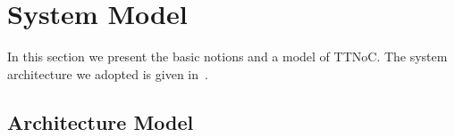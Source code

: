 \documentclass[journal]{IEEEtran}
\theoremstyle{remark}
\begin{document}
%



\section{System Model}
\label{s:model}

In this section we present the basic notions and a model of TTNoC.
The system architecture we adopted is given in~\cite{DBLP:conf/rtcsa/PaukovitsK08}. 

\subsection{Architecture Model}
\end{document}

